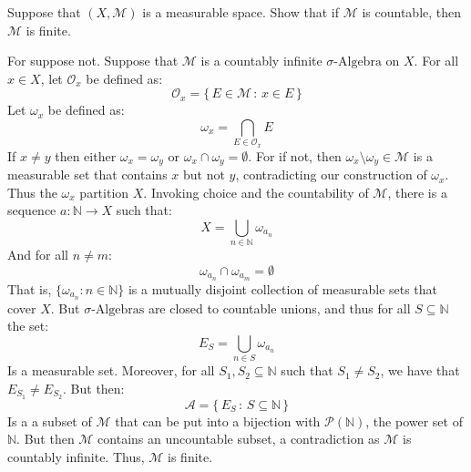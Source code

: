 \documentclass[crop=false,class=article]{standalone}                       %
\begin{document}
    \begin{problem}
        Suppose that $(X,\mathcal{M})$ is a measurable space. Show that
        if $\mathcal{M}$ is countable, then $\mathcal{M}$ is finite.
    \end{problem}
    \begin{solution}
        For suppose not. Suppose that $\mathcal{M}$ is a countably
        infinite $\sigma\textrm{-Algebra}$ on $X$. For all $x\in{X}$,
        let $\mathcal{O}_{x}$ be defined as:
        \begin{equation}
            \mathcal{O}_{x}=\big\{\,E\in\mathcal{M}\,:\,x\in{E}\,\}
        \end{equation}
        Let $\omega_{x}$ be defined as:
        \begin{equation}
            \omega_{x}=\bigcap_{E\in\mathcal{O}_{x}}E
        \end{equation}
        If $x\ne{y}$ then either $\omega_{x}=\omega_{y}$ or
        $\omega_{x}\cap\omega_{y}=\emptyset$. For if not, then
        $\omega_{x}\setminus\omega_{y}\in\mathcal{M}$ is a measurable
        set that contains $x$ but not $y$, contradicting our construction
        of $\omega_{x}$. Thus the $\omega_{x}$ partition $X$. Invoking
        choice and the countability of $\mathcal{M}$, there
        is a sequence $a:\mathbb{N}\rightarrow{X}$ such that:
        \begin{equation}
            X=\bigcup_{n\in\mathbb{N}}\omega_{a_{n}}
        \end{equation}
        And for all $n\ne{m}$:
        \begin{equation}
            \omega_{a_{n}}\cap\omega_{a_{m}}=\emptyset
        \end{equation}
        That is, $\{\omega_{a_{n}}:n\in\mathbb{N}\}$ is a mutually disjoint
        collection of measurable sets that cover $X$. But
        $\sigma\textrm{-Algebras}$ are closed to countable unions, and
        thus for all $S\subseteq\mathbb{N}$ the set:
        \begin{equation}
            E_{S}=\bigcup_{n\in{S}}\omega_{a_{n}}
        \end{equation}
        Is a measurable set. Moreover, for all
        $S_{1},S_{2}\subseteq\mathbb{N}$ such that $S_{1}\ne{S}_{2}$,
        we have that $E_{S_{1}}\ne{E}_{{S}_{2}}$. But then:
        \begin{equation}
            \mathcal{A}=\big\{\,E_{S}\,:\,S\subseteq\mathbb{N}\,\}
        \end{equation}
        Is a a subset of $\mathcal{M}$ that can be put into a bijection
        with $\mathcal{P}(\mathbb{N})$, the power set of $\mathbb{N}$.
        But then $\mathcal{M}$ contains an uncountable subset, a
        contradiction as $\mathcal{M}$ is countably infinite. Thus,
        $\mathcal{M}$ is finite.
    \end{solution}
\end{document}
